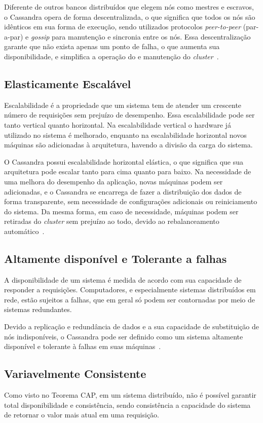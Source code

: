 Diferente de outros bancos distribuídos que elegem nós como mestres e escravos, o Cassandra opera de forma descentralizada, o que significa que todos os nós são idênticos em sua forma de execução, sendo utilizados protocolos \emph{peer-to-peer} (par-a-par) e \emph{gossip} para manutenção e sincronia entre os nós. Essa descentralização garante que não exista apenas um ponto de falha, o que aumenta sua disponibilidade, e simplifica a operação do e manutenção do \emph{cluster}~\cite{cassandraguide}.

\subsection*{Elasticamente Escalável}
Escalabilidade é a propriedade que um sistema tem de atender um crescente número de requisições sem prejuízo de desempenho. Essa escalabilidade pode ser tanto vertical quanto horizontal. Na escalabilidade vertical o hardware já utilizado no sistema é melhorado, enquanto na escalabilidade horizontal novos máquinas são adicionadas à arquitetura, havendo a divisão da carga do sistema.

O Cassandra possui escalabilidade horizontal elástica, o que significa que sua arquitetura pode escalar tanto para cima quanto para baixo. Na necessidade de uma melhora do desempenho da aplicação, novas máquinas podem ser adicionadas, e o Cassandra se encarrega de fazer a distribuição dos dados de forma transparente, sem necessidade de configurações adicionais ou reiniciamento do sistema. Da mesma forma, em caso de necessidade, máquinas podem ser retiradas do \emph{cluster} sem prejuízo ao todo, devido ao rebalanceamento automático~\cite{cassandraguide}.

\subsection*{Altamente disponível e Tolerante a falhas}
A disponibilidade de um sistema é medida de acordo com sua capacidade de responder a requisições. Computadores, e especialmente sistemas distribuídos em rede, estão sujeitos a falhas, que em geral só podem ser contornadas por meio de sistemas redundantes.

Devido a replicação e redundância de dados e a sua capacidade de substituição de nós indisponíveis, o Cassandra pode ser definido como um sistema altamente disponível e tolerante à falhas em suas máquinas~\cite{cassandraguide}.

\subsection*{Variavelmente Consistente}
Como visto no Teorema CAP, em um sistema distribuído, não é possível garantir total disponibilidade e consistência, sendo consistência a capacidade do sistema de retornar o valor mais atual em uma requisição.

